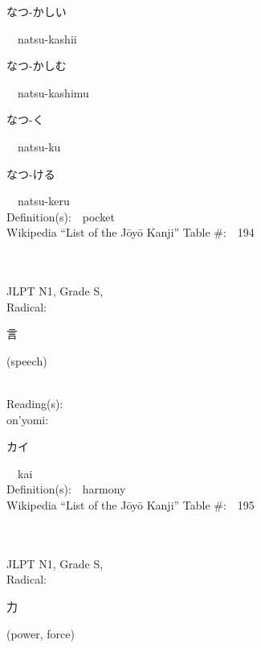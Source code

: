 \begin{multicols}{2}
{\hspace*{2em}}{\begin{CJK}{UTF8}{min} なつ-かしい \end{CJK}}\ \ natsu-kashii\ \ \\
{\hspace*{2em}}{\begin{CJK}{UTF8}{min} なつ-かしむ \end{CJK}}\ \ natsu-kashimu\ \ \\
{\hspace*{2em}}{\begin{CJK}{UTF8}{min} なつ-く \end{CJK}}\ \ natsu-ku\ \ \\
{\hspace*{2em}}{\begin{CJK}{UTF8}{min} なつ-ける \end{CJK}}\ \ natsu-keru\ \ \\
Definition(s):\ \ pocket \\
Wikipedia ``List of the J\=oy\=o Kanji'' Table \#:\ \ 194 \\
\ \ \\
{\fontsize{34pt}{40pt}  }\ \ \\
{JLPT N1, Grade S, \\Radical:\ \ {\begin{CJK}{UTF8}{min} 言 \end{CJK}} (speech) } \\
Reading(s):\ \ \\
{\hspace*{1em}}on'yomi:\ \ \\
{\hspace*{2em}}{\begin{CJK}{UTF8}{min} カイ \end{CJK}}\ \ kai\ \ \\
Definition(s):\ \ harmony \\
Wikipedia ``List of the J\=oy\=o Kanji'' Table \#:\ \ 195 \\
\ \ \\
{\fontsize{34pt}{40pt}  }\ \ \\
{JLPT N1, Grade S, \\Radical:\ \ {\begin{CJK}{UTF8}{min} 力 \end{CJK}} (power, force) } \\

\end{multicols}
